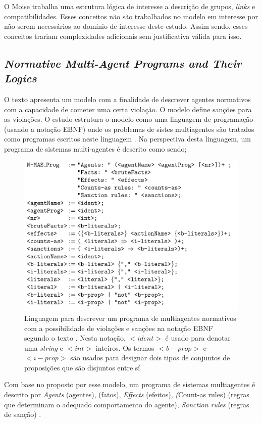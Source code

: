 \documentclass[12pt]{article}
\begin{document}
O Moise trabalha uma estrutura lógica de interesse a descrição de grupos, \textit{links} e compatibilidades. Esses conceitos não são trabalhados no modelo em interesse por não serem necessários ao domínio de interesse deste estudo. Assim sendo, esses conceitos trariam complexidades adicionais sem justificativa válida para isso.


\subsection{\textit{Normative Multi-Agent Programs and Their Logics}}

O texto \cite{dastaniNormativeMultiAgentProgram} apresenta um modelo com a finalidade de descrever agentes normativos com a capacidade de cometer uma certa violação. O modelo define sanções para as violações. O estudo estrutura o modelo como uma linguagem de programação (usando a notação EBNF) onde os problemas de sistes multiagentes são tratados como programas escritos neste linguagem \cite{dastaniNormativeMultiAgentProgram}. Na perspectiva desta linguagem, um programa de sistemas multi-agentes é descrito como sendo; 


\begin{figure}[H]
  \centering
  \includegraphics[width=0.8\linewidth]{masprogram.png} 
  \caption{Linguagem para descrever um programa de multiagentes normativos com a possibilidade de violações e sanções na notação EBNF segundo o texto \cite{dastaniNormativeMultiAgentProgram}. Nesta notação, $<ident>$ é usado para denotar uma \textit{string} e $<int>$ inteiros. Os termos $<b-prop>$ e $<i-prop>$ são usados para designar dois tipos de conjuntos de proposições que são disjuntos entre sí}
  \label{descreveprograma}
\end{figure}

Com base no proposto por esse modelo, um programa de sistemas multiagentes é descrito por \textit{Agents} (agentes),  (fatos), \textit{Effects} (efeitos), \textit(Count-as rules) (regras que determinam o adequado comportamento do agente), \textit{Sanction rules} (regras de sanção) \cite{dastaniNormativeMultiAgentProgram}. 
\end{document}
